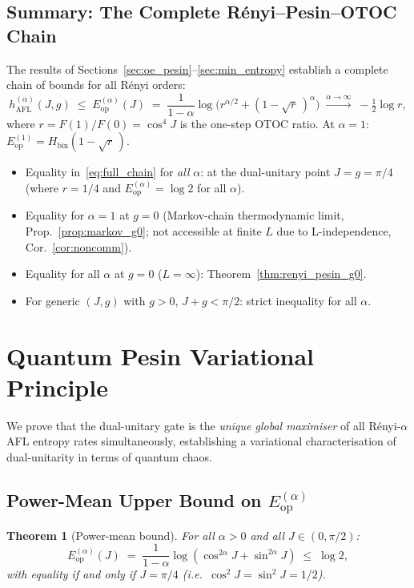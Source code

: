 \documentclass[12pt,a4paper]{article}
\newtheorem{theorem}{Theorem}[section]
\begin{document}
\subsection{Summary: The Complete Rényi–Pesin–OTOC Chain}

The results of Sections~\ref{sec:oe_pesin}–\ref{sec:min_entropy} establish a
complete chain of bounds for all Rényi orders:
\begin{equation}\label{eq:full_chain}
  h^{(\alpha)}_\mathrm{AFL}(J,g)
  \;\le\; E^{(\alpha)}_\mathrm{op}(J)
  \;=\; \frac{1}{1-\alpha}\log\!\bigl(r^{\alpha/2} + (1-\sqrt{r}\,)^\alpha\bigr)
  \;\xrightarrow{\alpha\to\infty}\; -\tfrac{1}{2}\log r,
\end{equation}
where $r = F(1)/F(0) = \cos^4\!J$ is the one-step OTOC ratio.  At $\alpha=1$:
$E^{(1)}_\mathrm{op} = H_\mathrm{bin}(1-\sqrt{r}\,)$.
\begin{itemize}
\item Equality in~\eqref{eq:full_chain} for \emph{all} $\alpha$: at the dual-unitary
  point $J=g=\pi/4$ (where $r=1/4$ and $E^{(\alpha)}_\mathrm{op}=\log 2$ for all $\alpha$).
\item Equality for $\alpha=1$ at $g=0$ (Markov-chain thermodynamic limit, Prop.~\ref{prop:markov_g0};
  not accessible at finite $L$ due to L-independence, Cor.~\ref{cor:noncomm}).
\item Equality for all $\alpha$ at $g=0$ ($L=\infty$): Theorem~\ref{thm:renyi_pesin_g0}.
\item For generic $(J,g)$ with $g>0$, $J+g<\pi/2$: strict inequality for all $\alpha$.
\end{itemize}

\section{Quantum Pesin Variational Principle}
\label{sec:variational}

We prove that the dual-unitary gate is the \emph{unique global maximiser} of all
Rényi-$\alpha$ AFL entropy rates simultaneously, establishing a variational
characterisation of dual-unitarity in terms of quantum chaos.

\subsection{Power-Mean Upper Bound on $E^{(\alpha)}_\mathrm{op}$}

\begin{theorem}[Power-mean bound]\label{thm:power_mean}
For all $\alpha>0$ and all $J\in(0,\pi/2)$:
\begin{equation}\label{eq:pm_bound}
  E^{(\alpha)}_\mathrm{op}(J)
  \;=\; \frac{1}{1-\alpha}\log(\cos^{2\alpha}\!J + \sin^{2\alpha}\!J)
  \;\le\; \log 2,
\end{equation}
with equality if and only if $J=\pi/4$ (i.e.\ $\cos^2\!J = \sin^2\!J = 1/2$).
\end{theorem}
\end{document}
